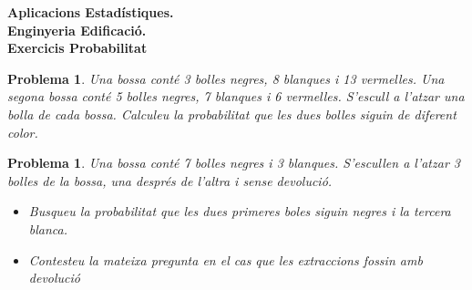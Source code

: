 \documentclass[11pt]{article}
\newcounter{prbcont}
\newtheorem{problema}[prbcont]{Problema}
\begin{document}
\begin{center}
\textbf{{\large {Aplicacions Estad\'{i}stiques.}\\Enginyeria Edificaci\'o.\\}}
\vspace{0.5cm}
\textbf{Exercicis Probabilitat}
\end{center}

\begin{problema}
Una bossa conté 3 bolles negres, 8 blanques i 13 vermelles. Una segona bossa cont\'e 5 bolles negres, 7 blanques i 6 vermelles. S'escull a l'atzar una bolla de cada bossa. Calculeu la probabilitat que les dues bolles siguin de diferent color.
\end{problema}



\begin{problema}
Una bossa cont\'e 7 bolles negres i 3 blanques. S'escullen a l'atzar 3 bolles de la bossa, una despr\'es de l'altra i sense devoluci\'o. 
\begin{itemize}
\item Busqueu la probabilitat que les dues primeres boles siguin negres i la tercera blanca.
\item Contesteu la mateixa pregunta en el cas que les extraccions fossin amb devoluci\'o
\end{itemize}
\end{problema}
\end{document}
